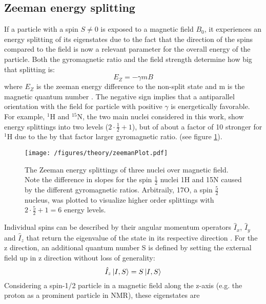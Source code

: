         \subsection{Zeeman energy splitting}
            If a particle with a spin $S\neq 0$ is exposed to a magnetic field $B_0$, it experiences an energy splitting of its eigenstates due to the fact that the direction of the spins compared to the field is now a relevant parameter for the overall energy of the particle. Both the gyromagnetic ratio and the field strength determine how big that splitting is:
            \begin{equation}
                E_{Z} = -\gamma m B
            \end{equation}
            where $E_Z$ is the zeeman energy difference to the non-split state and m is the magnetic quantum number \cite{gerlach_experimentelle_1989, bloch_nuclear_1946}. The negative sign implies that a antiparallel orientation with the field for particle with positive $\gamma$ is energetically favorable. For example, $^1$H and $^{15}$N, the two main nuclei considered in this work, show energy splittings into two levels ($2\cdot\tfrac{1}{2}+1$), but of about a factor of 10 stronger for $^1$H due to the by that factor larger gyromagnetic ratio. (see figure \ref{figure:theory:zeemanSplittings}).
            \begin{figure}
                \centering
                \texttt{[image: /figures/theory/zeemanPlot.pdf]}
                \caption[Zeeman energy splitting]{The Zeeman energy splittings of three nuclei over magnetic field. Note the difference in slopes for the spin $\tfrac{1}{2}$ nuclei 1H and 15N caused by the different gyromagnetic ratios. Arbitraily, 17O, a spin $\tfrac{5}{2}$ nucleus, was plotted to visualize higher order splittings with $2 \cdot\tfrac{5}{2}+1 = 6$ energy levels. }
                \label{figure:theory:zeemanSplittings}
            \end{figure}
            Individual spins can be described by their angular momentum operators $\hat{I}_x$, $\hat{I}_y$ and $\hat{I}_z$ that return the eigenvalue of the state in its respective direction \cite{pauli_zur_1988}. For the z direction, an additional quantum number S is defined by setting the external field up in z direction without loss of generality:
            \begin{equation}
                \hat I_z \ket{I, S} = S \ket{I,S}
            \end{equation}
            Considering a spin-1/2 particle in a magnetic field along the z-axis (e.g. the proton as a prominent particle in NMR), these eigenstates are
